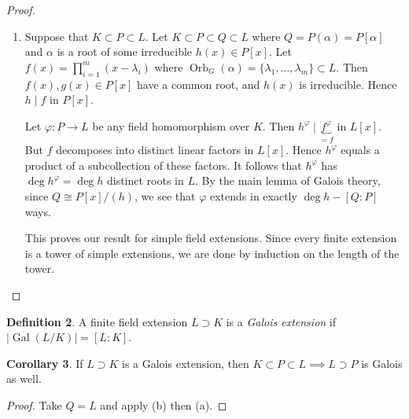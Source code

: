 \documentclass[10pt,letterpaper,cm]{nupset}
\theoremstyle{definition}
\newtheorem{definition}{Definition}[subsection]
\theoremstyle{theorem}
\newtheorem{lemma}[definition]{Lemma}
\newtheorem{corollary}[definition]{Corollary}
\theoremstyle{remark}
\newcommand{\1}{\mathbf{1}}
\newcommand{\0}{\vec 0}
\DeclareMathOperator{\gal}{Gal}
\DeclareMathOperator{\orb}{Orb}
\begin{document}
\begin{proof}
\begin{enumerate}[label=(\alph*)]
We have shown that $L = \bigcup_{g\in G} L_g$.
\begin{lemma}
If $K$ is an infinite field and $V$ is a finite-dimensional $K$-vector space and $V_1, V_2, \ldots, V_g \subset V$ are subspaces, then $V= \bigcup_{i=1}^g V_i \implies V = V_k$ for some $k$.
\end{lemma}
\begin{proof}
Suppose that each $V_i \subsetneq V$ and that $V= \bigcup_{i=1}^g V_i $. Then there exists a linear map $f_i : V \to K$ such that $f_i \restriction_{V_i} =0$ and $f_i \ne 0$. Then $f: V \to K$ given by $f = \prod_{i=1}^kf_i$ is the function associates with a nonzero polynomial in $V= K^n$ of degree $s$.  But $f$ is the zero function since $V = \bigcup_{i=1}^k V_i$, a contradiction.
\end{proof}
\item  Suppose that $K \subset P \subset L$. Let $K \subset P \subset Q \subset L$ where $Q = P(\alpha) = P[\alpha]$ and $\alpha$ is a root of some irreducible $h(x) \in P[x]$. Let $f(x) = \prod_{i=1}^m (x-\lambda_i)$ where $\orb_G(\alpha) = \{\lambda_1, \ldots, \lambda_m\} \subset L$. Then $f(x), g(x) \in P[x]$ have a common root, and $h(x)$ is irreducible. Hence $h\mid f$ in $P[x]$.

Let $\varphi : P \to L$ be any field homomorphism over $K$.  Then $h^{\varphi}\mid \underbrace{f^{\varphi}}_{=f}$ in $L[x]$. But $f$ decomposes into distinct linear factors in $L[x]$. Hence $h^{\varphi}$ equals a product of a subcollection of these factors.  It follows that $h^{\varphi}$ has $\deg{h^{\varphi}}= \deg{h}$ distinct roots in $L$. By the main lemma of Galois theory, since $Q \cong P[x]/(h)$, we see that $\varphi$ extends in exactly $\deg{h} - [Q:P]$ ways. 

This proves our result for simple field extensions. Since every finite extension is a tower of simple extensions, we are done by induction on the length of the tower. 
\end{enumerate}
\end{proof}

\begin{definition}
A finite field extension $L \supset K$ is a \textit{Galois extension} if $\lvert{\gal(L/K)}\rvert = [L:K]$.
\end{definition}

\begin{corollary}\label{cor16}
If $L\supset K$ is a Galois extension, then $K \subset P \subset L \implies L\supset P$ is Galois as well.
\end{corollary}
\begin{proof}
Take $Q= L$ and apply (b) then (a).
\end{proof}
\end{document}
